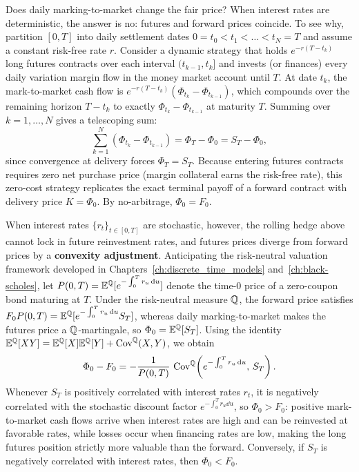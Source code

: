 Does daily marking-to-market change the fair price? When interest rates are deterministic, the answer is no: futures and forward prices coincide. To see why, partition $[0, T]$ into daily settlement dates $0 = t_0 < t_1 < \dots < t_N = T$ and assume a constant risk-free rate $r$. Consider a dynamic strategy that holds $e^{-r(T - t_k)}$ long futures contracts over each interval $(t_{k-1}, t_k]$ and invests (or finances) every daily variation margin flow in the money market account until $T$. At date $t_k$, the mark-to-market cash flow is $e^{-r(T - t_k)}(\Phi_{t_k} - \Phi_{t_{k-1}})$, which compounds over the remaining horizon $T - t_k$ to exactly $\Phi_{t_k} - \Phi_{t_{k-1}}$ at maturity $T$. Summing over $k = 1, \dots, N$ gives a telescoping sum:
\[
    \sum_{k=1}^{N} (\Phi_{t_k} - \Phi_{t_{k-1}}) = \Phi_T - \Phi_0 = S_T - \Phi_0,
\]
since convergence at delivery forces $\Phi_T = S_T$. Because entering futures contracts requires zero net purchase price (margin collateral earns the risk-free rate), this zero-cost strategy replicates the exact terminal payoff of a forward contract with delivery price $K = \Phi_0$. By no-arbitrage, $\Phi_0 = F_0$.

When interest rates $\{r_t\}_{t \in [0, T]}$ are stochastic, however, the rolling hedge above cannot lock in future reinvestment rates, and futures prices diverge from forward prices by a \textbf{convexity adjustment}. Anticipating the risk-neutral valuation framework developed in Chapters~\ref{ch:discrete_time_models} and~\ref{ch:black-scholes}, let $P(0, T) = \mathbb{E}^{\mathbb{Q}}[e^{-\int_0^T r_u \,\mathrm{d} u}]$ denote the time-$0$ price of a zero-coupon bond maturing at $T$. Under the risk-neutral measure $\mathbb{Q}$, the forward price satisfies $F_0 P(0, T) = \mathbb{E}^{\mathbb{Q}}[e^{-\int_0^T r_u \,\mathrm{d} u} S_T]$, whereas daily marking-to-market makes the futures price a $\mathbb{Q}$-martingale, so $\Phi_0 = \mathbb{E}^{\mathbb{Q}}[S_T]$. Using the identity $\mathbb{E}^{\mathbb{Q}}[XY] = \mathbb{E}^{\mathbb{Q}}[X]\mathbb{E}^{\mathbb{Q}}[Y] + \operatorname{Cov}^{\mathbb{Q}}(X, Y)$, we obtain
\begin{equation}
\label{eq:futures_forward_convexity}
    \Phi_0 - F_0 = -\frac{1}{P(0, T)}\, \operatorname{Cov}^{\mathbb{Q}}\!\left(e^{-\int_0^T r_u \,\mathrm{d} u},\, S_T\right).
\end{equation}
Whenever $S_T$ is positively correlated with interest rates $r_t$, it is negatively correlated with the stochastic discount factor $e^{-\int_0^T r_u \dd u}$, so $\Phi_0 > F_0$: positive mark-to-market cash flows arrive when interest rates are high and can be reinvested at favorable rates, while losses occur when financing rates are low, making the long futures position strictly more valuable than the forward. Conversely, if $S_T$ is negatively correlated with interest rates, then $\Phi_0 < F_0$.

